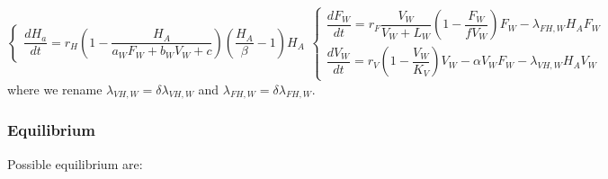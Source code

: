 \documentclass{article}
\newcommand{\lfw}{\lambda_{FH, W}}
\newcommand{\lvw}{\lambda_{VH, W}}
\begin{document}
\begin{subequations}
\begin{equation}
\left\lbrace \begin{array}{l}
\dfrac{dH_{a}}{dt}=r_{H}\left(1-\dfrac{H_A}{a_{W}F_{W}+b_{W}V_{W}+c}\right)\left(\dfrac{H_{A}}{\beta}-1\right)H_{A}
\end{array} \right.
\end{equation}
\begin{equation}
\left\lbrace \begin{array}{l}
\dfrac{dF_W}{dt} = r_F \dfrac{V_W}{V_W + L_W} \left(1 - \dfrac{F_W}{f V_W}\right) F_W - \lfw H_A F_W\\
\dfrac{dV_W}{dt} = r_V \left(1 - \dfrac{V_W}{K_V}\right) V_W - \alpha V_W F_W - \lvw H_A V_W
\end{array} \right.
\end{equation}
\end{subequations}
where we rename $\lvw = \delta \lvw$ and $ \lfw = \delta \lfw$.

\subsubsection{Equilibrium}
Possible equilibrium are:
\end{document}
